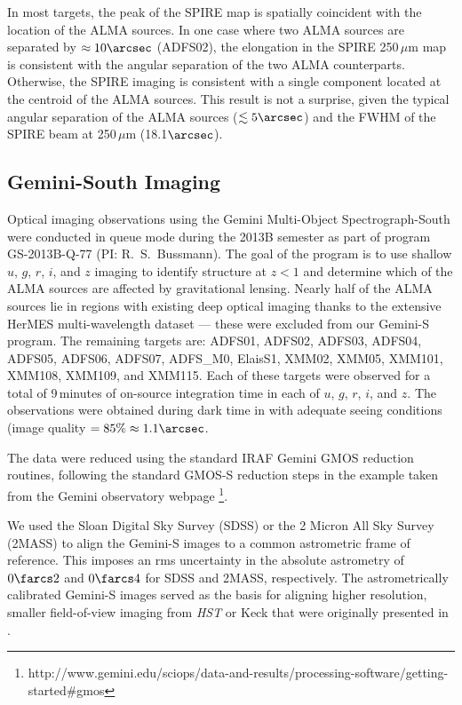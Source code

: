 \documentclass[iop]{emulateapj}
\begin{document}
In most targets, the peak of the SPIRE map is spatially coincident with the
location of the ALMA sources.  In one case where two ALMA sources are separated
by $\approx 10\arcsec$ (ADFS02), the elongation in the SPIRE 250$\,\mu$m map is
consistent with the angular separation of the two ALMA counterparts.
Otherwise, the SPIRE imaging is consistent with a single component located at
the centroid of the ALMA sources.  This result is not a surprise, given the
typical angular separation of the ALMA sources ($\lesssim 5\arcsec$) and the
FWHM of the SPIRE beam at 250$\,\mu$m (18.1$\arcsec$). 

\subsection{Gemini-South Imaging}\label{sec:geminiobs}

Optical imaging observations using the Gemini Multi-Object Spectrograph-South
\citep[GMOS-S;][]{Hook:2004qy} were conducted in queue mode during the 2013B
semester as part of program GS-2013B-Q-77 (PI: R.~S.~Bussmann).  The goal of the
program is to use shallow $u$, $g$, $r$, $i$, and $z$ imaging to identify
structure at $z<1$ and determine which of the ALMA sources are affected by
gravitational lensing.  Nearly half of the ALMA sources lie in regions with
existing deep optical imaging thanks to the extensive HerMES multi-wavelength
dataset --- these were excluded from our Gemini-S program.  The remaining
targets are: ADFS01, ADFS02, ADFS03, ADFS04, ADFS05, ADFS06, ADFS07, ADFS\_M0,
ElaisS1, XMM02, XMM05, XMM101, XMM108, XMM109, and XMM115.  Each of these
targets were observed for a total of 9$\,$minutes of on-source integration time
in each of $u$, $g$, $r$, $i$, and $z$.  The observations were obtained during
dark time in with adequate seeing conditions (image quality $ = 85\% \approx
1.1\arcsec$.

The data were reduced using the standard {\sc IRAF} Gemini GMOS reduction
routines, following the standard GMOS-S reduction steps in the example taken
from the Gemini observatory webpage
\footnote{http://www.gemini.edu/sciops/data-and-results/processing-software/getting-started\#gmos}.

We used the Sloan Digital Sky Survey (SDSS) or the 2 Micron All Sky Survey
(2MASS) to align the Gemini-S images to a common astrometric frame of
reference.  This imposes an rms uncertainty in the absolute astrometry of
$0\farcs2$ and $0\farcs4$ for SDSS and 2MASS, respectively.  The
astrometrically calibrated Gemini-S images served as the basis for aligning
higher resolution, smaller field-of-view imaging from {\it HST} or Keck that
were originally presented in \citet{Calanog:2014lr}.
\end{document}
